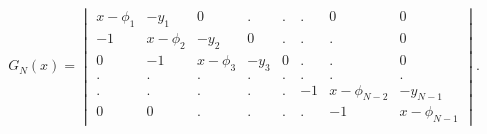 \begin{equation}
    G_N(x) = \begin{vmatrix}
    x-\phi_1 & -y_1 & 0 & . & . & . & 0  & 0\\
    -1 & x-\phi_2 & -y_2 & 0 & . & . & . & 0\\
    0 & -1 & x-\phi_3 & -y_3 & 0 & . & . & 0\\
    . & . & . & . & . & . & . & . \\
    . & . & .& .& .& -1 & x-\phi_{N-2} & -y_{N-1}\\
    0 & 0 & . & .& .& . & -1 & x-\phi_{N-1}\end{vmatrix}.
\end{equation}

